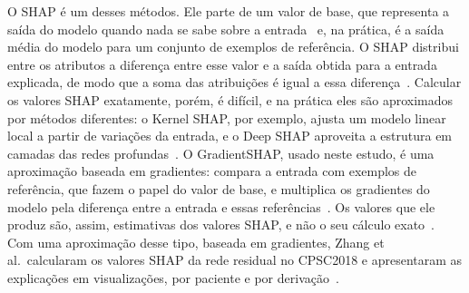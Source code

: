 O SHAP é um desses métodos. Ele parte de um valor de base, que representa a saída do modelo quando nada se sabe sobre a entrada~\cite{lundberg2017} e, na prática, é a saída média do modelo para um conjunto de exemplos de referência. O SHAP distribui entre os atributos a diferença entre esse valor e a saída obtida para a entrada explicada, de modo que a soma das atribuições é igual a essa diferença~\cite{lundberg2017}. Calcular os valores SHAP exatamente, porém, é difícil, e na prática eles são aproximados por métodos diferentes: o Kernel SHAP, por exemplo, ajusta um modelo linear local a partir de variações da entrada, e o Deep SHAP aproveita a estrutura em camadas das redes profundas~\cite{lundberg2017}. O GradientSHAP, usado neste estudo, é uma aproximação baseada em gradientes: compara a entrada com exemplos de referência, que fazem o papel do valor de base, e multiplica os gradientes do modelo pela diferença entre a entrada e essas referências~\cite{kokhlikyan2020}. Os valores que ele produz são, assim, estimativas dos valores SHAP, e não o seu cálculo exato~\cite{mercier2022}. Com uma aproximação desse tipo, baseada em gradientes, Zhang et al.\ calcularam os valores SHAP da rede residual no CPSC2018 e apresentaram as explicações em visualizações, por paciente e por derivação~\cite{zhang2021}.

